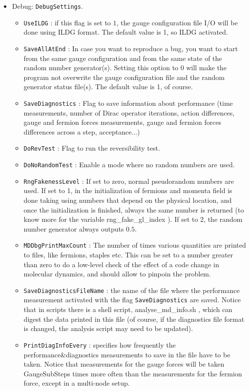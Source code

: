 \begin{itemize}
\item{Debug: \verb|DebugSettings|.}
\begin{itemize}
 \item \verb|UseILDG| : if this flag is set to $1$, the gauge configuration 
file  I/O will be done using ILDG format. The default value is 1, so ILDG 
activated.
 \item \verb|SaveAllAtEnd| : In case you want to reproduce a bug, you want to 
start from the same gauge configuration and from the same state of the random 
number generator(s). Setting this option to 0 will make the program not 
overwrite the gauge configuration file and the random generator status file(s). 
The default value is 1, of course.
 \item \verb|SaveDiagnostics| : Flag to save information about performance (time measurements, number of Dirac operator iterations, action differences, gauge and
 fermion forces measurements, gauge and fermion forces differences across a step, acceptance...)
 \item \verb|DoRevTest| : Flag to run the reversibility test.
 \item \verb|DoNoRandomTest| : Enable a mode where no random numbers are used.
 \item \verb|RngFakenessLevel| : If set to zero, normal pseudorandom numbers are used. 
 If set to 1, in the initialization of fermions and momenta field is done taking using numbers that depend on the physical location, and once the initialization is finished, always the same number is returned (to know more for the variable \textsf{ rng\_fake\_gl\_index }). If set to 2, the random number generator always outputs $0.5$.
 \item \verb|MDDbgPrintMaxCount| : The number of times various quantities are printed to files, like fermions, staples etc. This can be set to a number greater than zero to do a low-level check of the effect of a code change in molecular dynamics, and should allow to pinpoin the problem.
 \item \verb|SaveDiagnosticsFileName| : the name of the file where the performance measurement activated with the flag \verb|SaveDiagnostics| are saved. Notice that in \textsf{ scripts} there is a shell script, \textsf{ analyse\_md\_info.sh }, which can digest the data printed in this file (of course, if the diagnostics file format is changed, the analysis script may need to be updated).
 \item \verb|PrintDiagInfoEvery| : specifies how frequently the performance\&diagnostics
 measurements to save in the file have to be taken. Notice that measurements for the gauge forces will be taken \textsf{ GaugeSubSteps} times more often than the measurements for the fermion force, except in a multi-node setup.
\end{itemize}


\end{itemize}
